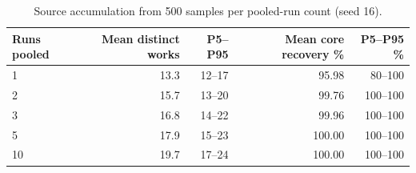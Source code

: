 \begin{table}[ht]
\centering
\caption{Source accumulation from 500 samples per pooled-run count (seed 16).}
\begin{tabular}{lrrrr}
\toprule
Runs pooled & Mean distinct works & P5--P95 & Mean core recovery \% & P5--P95 \% \\
\midrule
1 & 13.3 & 12--17 & 95.98 & 80--100 \\
2 & 15.7 & 13--20 & 99.76 & 100--100 \\
3 & 16.8 & 14--22 & 99.96 & 100--100 \\
5 & 17.9 & 15--23 & 100.00 & 100--100 \\
10 & 19.7 & 17--24 & 100.00 & 100--100 \\
\bottomrule
\end{tabular}
\end{table}
